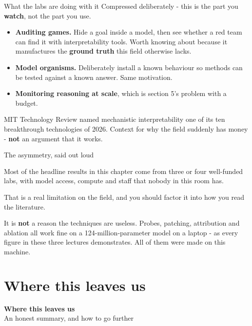 \documentclass[aspectratio=169]{beamer}
\newcommand{\trapbox}[1]{%
  \begin{tcolorbox}[colback=armred!8, colframe=armred, boxrule=0.6pt, arc=2pt]
  #1
  \end{tcolorbox}}
\newcommand{\takebox}[1]{%
  \begin{tcolorbox}[colback=paramgreen!8, colframe=paramgreen, boxrule=0.6pt, arc=2pt]
  #1
  \end{tcolorbox}}
\newcommand{\sectiontransition}[2]{%
  \begin{frame}[plain]
    \vfill
    \begin{center}
      {\Huge\bfseries\color{popblue} #1}\\[1.1em]
      {\large #2}
    \end{center}
    \vfill
  \end{frame}}
\begin{document}
\begin{frame}{What the labs are doing with it}
  \vspace{0.6em}
  Compressed deliberately - this is the part you \textbf{watch}, not the part you use.

  \vspace{0.6em}
  \begin{itemize}
    \item \textbf{Auditing games.} Hide a goal inside a model, then see whether a red team can
      find it with interpretability tools. Worth knowing about because it manufactures the
      \textbf{ground truth} this field otherwise lacks.
    \item \textbf{Model organisms.} Deliberately install a known behaviour so methods can be
      tested against a known answer. Same motivation.
    \item \textbf{Monitoring reasoning at scale}, which is section 5's problem with a budget.
  \end{itemize}

  \vspace{0.7em}
  {\footnotesize MIT Technology Review named mechanistic interpretability one of its ten
  breakthrough technologies of 2026. Context for why the field suddenly has money - \textbf{not}
  an argument that it works.}
\end{frame}

\begin{frame}{The asymmetry, said out loud}
  \vspace{1.0em}
  \trapbox{Most of the headline results in this chapter come from three or four well-funded labs,
  with model access, compute and staff that nobody in this room has.}

  \vspace{1.0em}
  That is a real limitation on the field, and you should factor it into how you read the
  literature.

  \vspace{1.0em}
  \takebox{It is \textbf{not} a reason the techniques are useless. Probes, patching, attribution
  and ablation all work fine on a 124-million-parameter model on a laptop - as every figure in
  these three lectures demonstrates. All of them were made on this machine.}
\end{frame}

\section{Where this leaves us}
\sectiontransition{Where this leaves us}{An honest summary, and how to go further}
\end{document}
